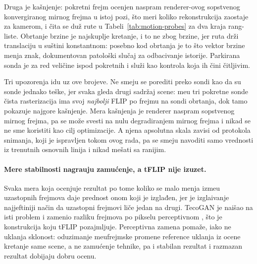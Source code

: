 Druga je kašnjenje: pokretni frejm ocenjen naspram renderer-ovog sopstvenog konvergiranog mirnog frejma u istoj
pozi, \v{s}to meri koliko rekonstrukcija zaostaje za kamerom, i \v{c}ita se du\v{z} rute u
Tabeli~\ref{tab:motion-probes} za dva kraja rang-liste. Obrtanje brzine je najskuplje
kretanje, i to ne zbog brzine, jer ruta dr\v{z}i translaciju u su\v{s}tini konstantnom: posebno kod obrtanja je to
\v{s}to vektor brzine menja znak, dokumentovan patolo\v{s}ki slu\v{c}aj za odbacivanje istorije.
Parkirana sonda je za red veli\v{c}ine ispod pokretnih i slu\v{z}i kao
kontrola koja ih \v{c}ini \v{c}itljivim.

\begin{table}[tbp]
\caption[Stabilnost i kašnjenje po sondi rute]{Iste dve temporalne mere razlo\v{z}ene po ta\v{c}ki sonde,
za krajeve rang-liste. Vrednosti se ne porede preko kolona: svaka sonda gleda razli\v{c}it
sadr\v{z}aj, pa je razlika izme\dj{}u njih uglavnom razlika u onome \v{s}to je na ekranu.}
\label{tab:motion-probes}
\centering

\end{table}

Tri upozorenja idu uz ove brojeve. Ne smeju se porediti preko sondi kao da su sonde
jednako te\v{s}ke, jer svaka gleda drugi sadr\v{z}aj scene: me\dj{}u tri pokretne sonde \v{c}ista
rasterizacija ima svoj \emph{najbolji} FLIP po frejmu na sondi obrtanja, dok tamo pokazuje najgore kašnjenje. Mera kašnjenja je
renderer naspram sopstvenog mirnog frejma, pa se mo\v{z}e svesti na nulu degradiranjem mirnog frejma i nikad se ne sme
koristiti kao cilj optimizacije. A njena apsolutna skala zavisi od protokola snimanja, koji je
ispravljen tokom ovog rada, pa se smeju navoditi samo vrednosti iz trenutnih osnovnih linija i nikad mešati
sa ranijim.

\paragraph{Mere stabilnosti nagra\dj uju zamu\'cenje, a tFLIP nije izuzet.} Svaka mera koja ocenjuje rezultat
po tome koliko se malo menja izme\dj{}u uzastopnih frejmova daje prednost onom koji je izglađen, jer
je izgla\dj ivanje najjeftiniji na\v{c}in da uzastopni frejmovi li\v{c}e jedan na drugi. TecoGAN je naišao na isti
problem i zamenio razliku frejmova po pikselu perceptivnom \cite{chu2020tecogan}, \v{s}to je
konstrukcija koju tFLIP pozajmljuje. Perceptivna zamena poma\v{z}e, iako ne uklanja
sklonost: oduzimanje me\dj{}ufrejmske promene reference uklanja iz ocene kretanje same scene,
a ne zamu\'cenje tehnike, pa i stabilan rezultat i razmazan rezultat dobijaju dobru ocenu.

